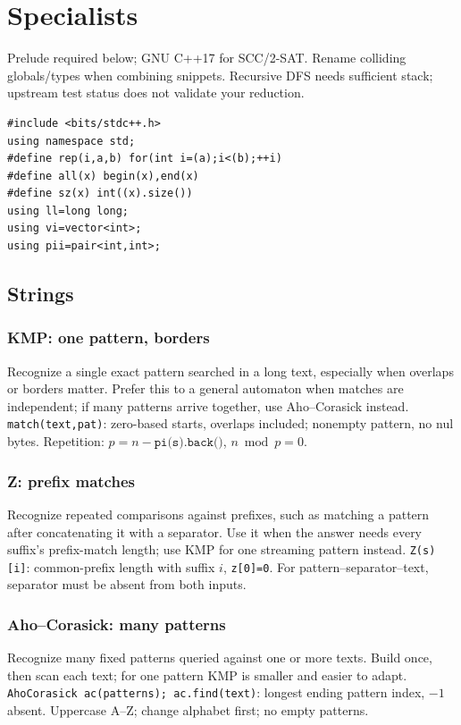 \chapter{Specialists}
\noindent Prelude required below; GNU C++17 for SCC/2-SAT.
Rename colliding globals/types when combining snippets. Recursive DFS needs
sufficient stack; upstream test status does not validate your reduction.
\begin{lstlisting}
#include <bits/stdc++.h>
using namespace std;
#define rep(i,a,b) for(int i=(a);i<(b);++i)
#define all(x) begin(x),end(x)
#define sz(x) int((x).size())
using ll=long long;
using vi=vector<int>;
using pii=pair<int,int>;
\end{lstlisting}

\section{Strings}
\subsection{KMP: one pattern, borders}
Recognize a single exact pattern searched in a long text, especially when
overlaps or borders matter. Prefer this to a general automaton when matches
are independent; if many patterns arrive together, use Aho--Corasick instead.
\texttt{match(text,pat)}: zero-based starts, overlaps included; nonempty
pattern, no nul bytes. Repetition: $p=n-\texttt{pi(s).back()}$, $n\bmod p=0$.

\subsection{Z: prefix matches}
Recognize repeated comparisons against prefixes, such as matching a pattern
after concatenating it with a separator. Use it when the answer needs every
suffix's prefix-match length; use KMP for one streaming pattern instead.
\texttt{Z(s)[i]}: common-prefix length with suffix $i$, \texttt{z[0]=0}.
For pattern--separator--text, separator must be absent from both inputs.

\subsection{Aho--Corasick: many patterns}
Recognize many fixed patterns queried against one or more texts. Build once,
then scan each text; for one pattern KMP is smaller and easier to adapt.
\texttt{AhoCorasick ac(patterns); ac.find(text)}: longest ending pattern
index, $-1$ absent. Uppercase A--Z; change alphabet first; no empty patterns.

